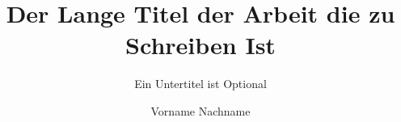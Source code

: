 \documentclass[draft,phd]{swathesis}
\author{Vorname Nachname}
\title{Der Lange Titel der Arbeit die zu Schreiben Ist}
\subtitle{Ein Untertitel ist Optional}
\begin{document}
\frontmatter
\begin{otherlanguage}{ngerman}
\maketitle
\end{otherlanguage}

\mainmatter


\printbibliography

\backmatter
\end{document}
